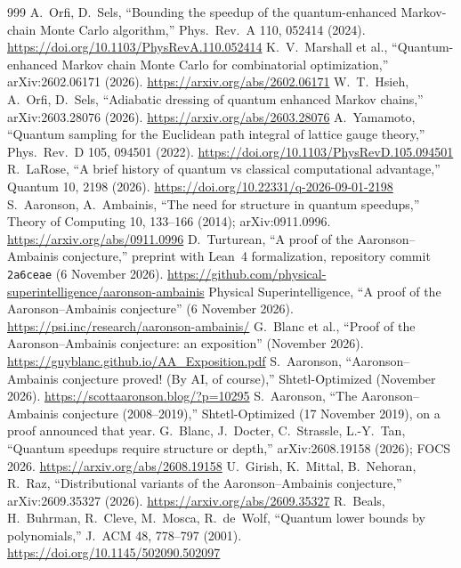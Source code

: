 \documentclass[10pt,a4paper]{article}
\begin{document}
\begin{thebibliography}{999}
 A.~Orfi, D.~Sels, ``Bounding the speedup of the quantum-enhanced Markov-chain Monte Carlo algorithm,'' Phys.\ Rev.\ A 110, 052414 (2024). \url{https://doi.org/10.1103/PhysRevA.110.052414}
 K.~V.~Marshall et al., ``Quantum-enhanced Markov chain Monte Carlo for combinatorial optimization,'' arXiv:2602.06171 (2026). \url{https://arxiv.org/abs/2602.06171}
 W.~T.~Hsieh, A.~Orfi, D.~Sels, ``Adiabatic dressing of quantum enhanced Markov chains,'' arXiv:2603.28076 (2026). \url{https://arxiv.org/abs/2603.28076}
 A.~Yamamoto, ``Quantum sampling for the Euclidean path integral of lattice gauge theory,'' Phys.\ Rev.\ D 105, 094501 (2022). \url{https://doi.org/10.1103/PhysRevD.105.094501}
 R.~LaRose, ``A brief history of quantum vs classical computational advantage,'' Quantum 10, 2198 (2026). \url{https://doi.org/10.22331/q-2026-09-01-2198}
 S.~Aaronson, A.~Ambainis, ``The need for structure in quantum speedups,'' Theory of Computing 10, 133--166 (2014); arXiv:0911.0996. \url{https://arxiv.org/abs/0911.0996}
 D.~Turturean, ``A proof of the Aaronson--Ambainis conjecture,'' preprint with Lean~4 formalization, repository commit \texttt{2a6ceae} (6 November 2026). \url{https://github.com/physical-superintelligence/aaronson-ambainis}
 Physical Superintelligence, ``A proof of the Aaronson--Ambainis conjecture'' (6 November 2026). \url{https://psi.inc/research/aaronson-ambainis/}
 G.~Blanc et al., ``Proof of the Aaronson--Ambainis conjecture: an exposition'' (November 2026). \url{https://guyblanc.github.io/AA_Exposition.pdf}
 S.~Aaronson, ``Aaronson--Ambainis conjecture proved! (By AI, of course),'' Shtetl-Optimized (November 2026). \url{https://scottaaronson.blog/?p=10295}
 S.~Aaronson, ``The Aaronson--Ambainis conjecture (2008--2019),'' Shtetl-Optimized (17 November 2019), on a proof announced that year.
 G.~Blanc, J.~Docter, C.~Strassle, L.-Y.~Tan, ``Quantum speedups require structure or depth,'' arXiv:2608.19158 (2026); FOCS 2026. \url{https://arxiv.org/abs/2608.19158}
 U.~Girish, K.~Mittal, B.~Nehoran, R.~Raz, ``Distributional variants of the Aaronson--Ambainis conjecture,'' arXiv:2609.35327 (2026). \url{https://arxiv.org/abs/2609.35327}
 R.~Beals, H.~Buhrman, R.~Cleve, M.~Mosca, R.~de~Wolf, ``Quantum lower bounds by polynomials,'' J.\ ACM 48, 778--797 (2001). \url{https://doi.org/10.1145/502090.502097}

\end{thebibliography}
\end{document}

